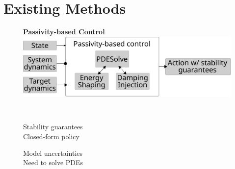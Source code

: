 \documentclass[
]{report}
\providecommand{\tightlist}{%
  \setlength{\itemsep}{0pt}\setlength{\parskip}{0pt}}\usepackage{longtable,booktabs,array}
\begin{document}
\hypertarget{existing-methods}{%
\section{Existing Methods}\label{existing-methods}}

\begin{figure}

\begin{minipage}[c]{0.61\linewidth}

{\centering 

\textbf{Passivity-based Control}
\includegraphics{contents/assets/pbc-outline.svg}

}

\end{minipage}%
%
\begin{minipage}[c]{0.03\linewidth}

{\centering 

~

}

\end{minipage}%
%
\begin{minipage}[c]{0.36\linewidth}

{\centering 

\begin{description}
\tightlist
\item[Strengths]
Stability guarantees\\
Closed-form policy
\item[Weaknesses]
Model uncertainties\\
Need to solve PDEs
\end{description}

}

\end{minipage}%

\end{figure}
\end{document}
